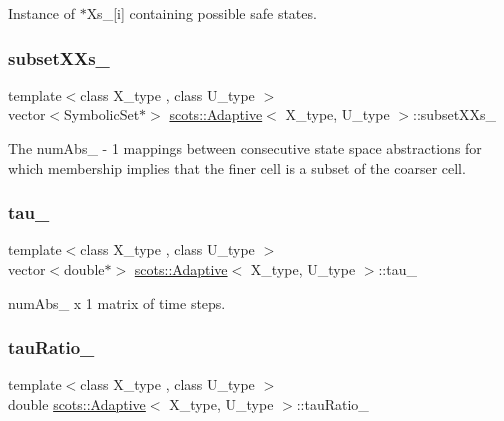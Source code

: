 Instance of $\ast$\+Xs\+\_\+\mbox{[}i\mbox{]} containing possible safe states. \mbox{\label{classscots_1_1Adaptive_a8b47913f64f175d3b2b1bebdfcb4ec39}} 
\subsubsection{\texorpdfstring{subset\+X\+Xs\+\_\+}{subsetXXs\_}}
{\footnotesize\ttfamily template$<$class X\+\_\+type , class U\+\_\+type $>$ \\
vector$<$Symbolic\+Set$\ast$$>$ \hyperlink{classscots_1_1Adaptive}{scots\+::\+Adaptive}$<$ X\+\_\+type, U\+\_\+type $>$\+::subset\+X\+Xs\+\_\+}

The num\+Abs\+\_\+ -\/ 1 mappings between consecutive state space abstractions for which membership implies that the finer cell is a subset of the coarser cell. \mbox{\label{classscots_1_1Adaptive_a2276dbf06b4db12739aed70443c1a32d}} 
\subsubsection{\texorpdfstring{tau\+\_\+}{tau\_}}
{\footnotesize\ttfamily template$<$class X\+\_\+type , class U\+\_\+type $>$ \\
vector$<$double$\ast$$>$ \hyperlink{classscots_1_1Adaptive}{scots\+::\+Adaptive}$<$ X\+\_\+type, U\+\_\+type $>$\+::tau\+\_\+}

num\+Abs\+\_\+ x 1 matrix of time steps. \mbox{\label{classscots_1_1Adaptive_a33592a853774854552908de4762f8f8c}} 
\subsubsection{\texorpdfstring{tau\+Ratio\+\_\+}{tauRatio\_}}
{\footnotesize\ttfamily template$<$class X\+\_\+type , class U\+\_\+type $>$ \\
double \hyperlink{classscots_1_1Adaptive}{scots\+::\+Adaptive}$<$ X\+\_\+type, U\+\_\+type $>$\+::tau\+Ratio\+\_\+}

